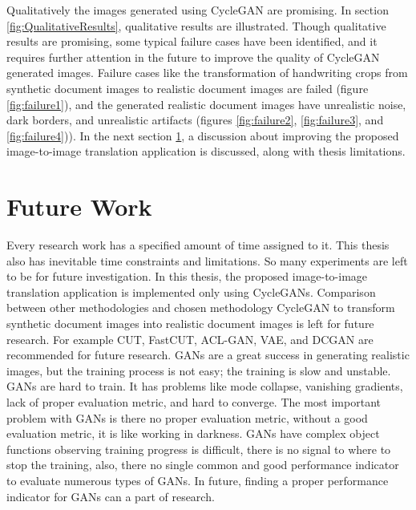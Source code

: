 Qualitatively the images generated using \ac{CycleGAN} are promising. In section \ref{fig:QualitativeResults}, qualitative results are illustrated. Though qualitative results are promising, some typical failure cases have been identified, and it requires further attention in the future to improve the quality of \ac{CycleGAN} generated images. Failure cases like the transformation of handwriting crops from synthetic document images to realistic document images are failed (figure \ref{fig:failure1}), and the generated realistic document images have unrealistic noise, dark borders, and unrealistic artifacts (figures \ref{fig:failure2}, \ref{fig:failure3}, and \ref{fig:failure4})). In the next section \ref{FutureWork}, a discussion about improving the proposed image-to-image translation application is discussed, along with thesis limitations.


\section{Future Work}\label{FutureWork}

Every research work has a specified amount of time assigned to it. This thesis also has inevitable time constraints and limitations. So many experiments are left to be for future investigation. In this thesis, the proposed image-to-image translation application is implemented only using \acp{CycleGAN}. Comparison between other methodologies and chosen methodology \ac{CycleGAN} to transform synthetic document images into realistic document images is left for future research. For example \ac{CUT}\cite{park2020contrastive}, \ac{FastCUT}\cite{park2020contrastive}, \ac{ACL-GAN}\cite{zhao2021unpaired}, \ac{VAE}\cite{Kingma_2019}, and \ac{DCGAN}\cite{radford2016unsupervised} are recommended for future research. \acp{GAN} are a great success in generating realistic images, but the training process is not easy; the training is slow and unstable. \acp{GAN} are hard to train. It has problems like mode collapse, vanishing gradients, lack of proper evaluation metric, and hard to converge. The most important problem with \acp{GAN} is there no proper evaluation metric, without a good evaluation metric, it is like working in darkness. \acp{GAN} have complex object functions observing training progress is difficult, there is no signal to where to stop the training, also, there no single common and good performance indicator to evaluate numerous types of \acp{GAN}. In future, finding a proper performance indicator for \acp{GAN} can a part of research. 

